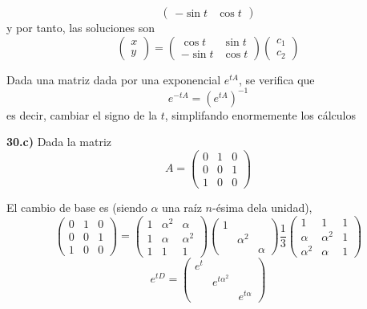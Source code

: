 \begin{sol}
$$\begin{pmatrix}
        -\sin t & \cos t
    \end{pmatrix}$$
    y por tanto, las soluciones son 
    $$\begin{pmatrix}
        x\\
        y
    \end{pmatrix}=\begin{pmatrix}
        \cos t & \sin t \\
        -\sin t & \cos t
    \end{pmatrix}\begin{pmatrix}
        c_1\\
        c_2
    \end{pmatrix}$$
    \begin{obs}
        Dada una matriz dada por una exponencial $e^{tA}$, se verifica que 
        $$e^{-tA}=\left( e^{tA}\right)^{-1}$$
        es decir, cambiar el signo de la $t$, simplifando enormemente los cálculos
    \end{obs}
\end{sol}
\begin{ejer}
    \textbf{30.c)} Dada la matriz
    $$A=\begin{pmatrix}
        0 & 1 & 0 \\
        0 & 0 & 1 \\
        1 & 0 & 0 
    \end{pmatrix}$$
\end{ejer}
\begin{sol}
    El cambio de base es (siendo $\alpha$ una raíz $n$-ésima dela unidad),
    $$\begin{pmatrix}
        0 & 1 & 0 \\
        0 & 0 & 1 \\
        1 & 0 & 0 
    \end{pmatrix}=\begin{pmatrix}
        1 & \alpha^2 & \alpha \\
        1 & \alpha & \alpha^2 \\
        1 & 1 & 1 
    \end{pmatrix}\begin{pmatrix}
        1 & & \\
         & \alpha^2 & \\
         &  & \alpha
    \end{pmatrix}\dfrac{1}{3}\begin{pmatrix}
        1 & 1 & 1 \\
        \alpha & \alpha^2 & 1 \\
        \alpha^2 & \alpha & 1 
    \end{pmatrix}$$
    $$e^{tD}=\begin{pmatrix}
         e^t & & \\
         & e^{t\alpha^2} & \\
         &  & e^{t\alpha}
    \end{pmatrix}$$
\end{sol}
